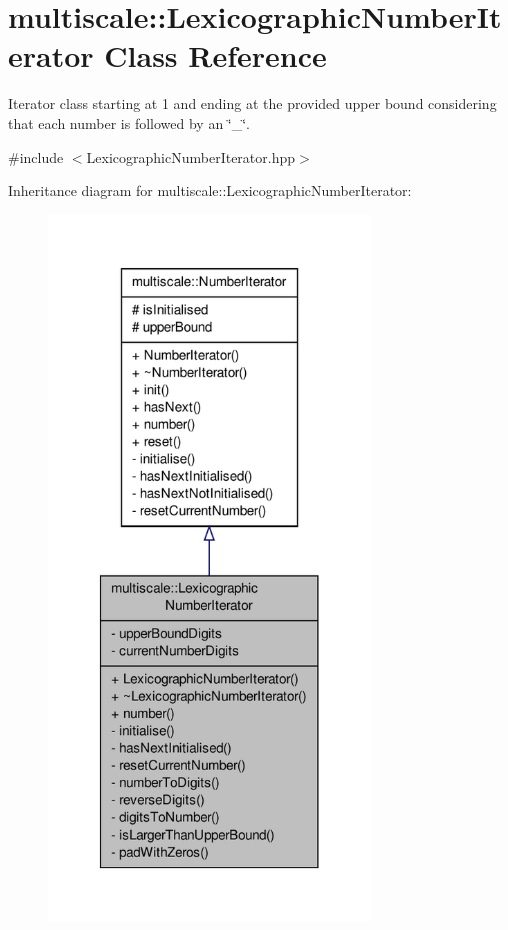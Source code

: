 \hypertarget{classmultiscale_1_1LexicographicNumberIterator}{\section{multiscale\-:\-:Lexicographic\-Number\-Iterator Class Reference}
\label{classmultiscale_1_1LexicographicNumberIterator}
}


Iterator class starting at 1 and ending at the provided upper bound considering that each number is followed by an \char`\"{}\-\_\-\char`\"{}.  




{\ttfamily \#include $<$Lexicographic\-Number\-Iterator.\-hpp$>$}



Inheritance diagram for multiscale\-:\-:Lexicographic\-Number\-Iterator\-:\nopagebreak
\begin{figure}[H]
\begin{center}
\leavevmode
\includegraphics[width=242pt]{classmultiscale_1_1LexicographicNumberIterator__inherit__graph}
\end{center}
\end{figure}


